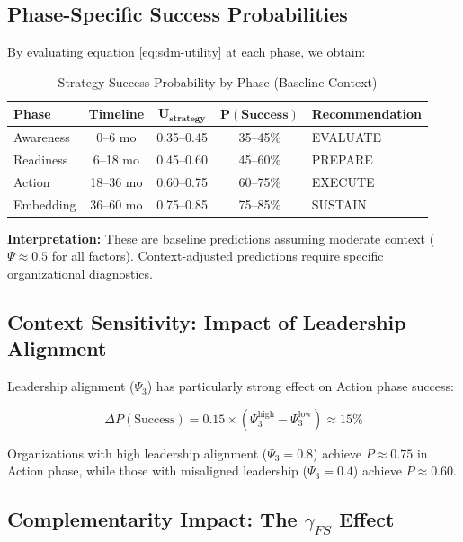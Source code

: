 \subsection{Phase-Specific Success Probabilities}

By evaluating equation \ref{eq:sdm-utility} at each phase, we obtain:

\begin{table}[htbp]
\centering
\caption{Strategy Success Probability by Phase (Baseline Context)}
\label{tab:sdm-predictions}
\renewcommand{\arraystretch}{1.4}
\begin{tabular}{@{}lcccl@{}}
\toprule
\textbf{Phase} & \textbf{Timeline} & $\mathbf{U_{\text{strategy}}}$ & $\mathbf{P(\text{Success})}$ & \textbf{Recommendation} \\
\midrule
Awareness & 0--6 mo & 0.35--0.45 & 35--45\% & EVALUATE \\
Readiness & 6--18 mo & 0.45--0.60 & 45--60\% & PREPARE \\
Action & 18--36 mo & 0.60--0.75 & 60--75\% & EXECUTE \\
Embedding & 36--60 mo & 0.75--0.85 & 75--85\% & SUSTAIN \\
\bottomrule
\end{tabular}
\end{table}

\textbf{Interpretation:} These are baseline predictions assuming moderate context ($\Psi \approx 0.5$ for all factors). Context-adjusted predictions require specific organizational diagnostics.

\subsection{Context Sensitivity: Impact of Leadership Alignment}

Leadership alignment ($\Psi_3$) has particularly strong effect on Action phase success:

\begin{equation}
\Delta P(\text{Success}) = 0.15 \times (\Psi_3^{\text{high}} - \Psi_3^{\text{low}}) \approx 15\%
\end{equation}

Organizations with high leadership alignment ($\Psi_3=0.8$) achieve $P \approx 0.75$ in Action phase, while those with misaligned leadership ($\Psi_3=0.4$) achieve $P \approx 0.60$.

\subsection{Complementarity Impact: The $\gamma_{FS}$ Effect}

